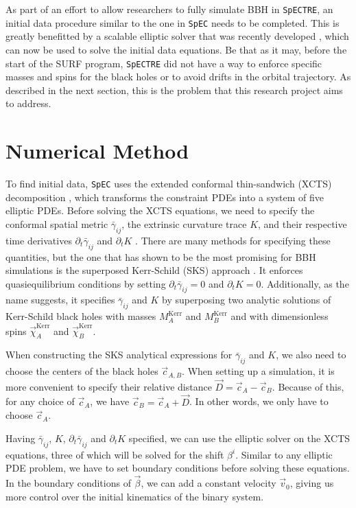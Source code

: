 \documentclass{../document}
\begin{document}
	As part of an effort to allow researchers to fully simulate BBH in {\tt SpECTRE}, an initial data procedure similar to the one in {\tt SpEC} needs to be completed. This is greatly benefitted by a scalable elliptic solver that was recently developed \cite{Vu}, which can now be used to solve the initial data equations. Be that as it may, before the start of the SURF program, {\tt SpECTRE} did not have a way to enforce specific masses and spins for the black holes or to avoid drifts in the orbital trajectory. As described in the next section, this is the problem that this research project aims to address.
  
  \section{Numerical Method}

  To find initial data, {\tt SpEC} uses the extended conformal thin-sandwich (XCTS) decomposition \cite{Serguei}, which transforms the constraint PDEs into a system of five elliptic PDEs. Before solving the XCTS equations, we need to specify the conformal spatial metric $\bar\gamma_{ij}$, the extrinsic curvature trace $K$, and their respective time derivatives $\partial_t \bar\gamma_{ij}$ and $\partial_t K$ \cite{BaumgarteShapiro}. There are many methods for specifying these quantities, but the one that has shown to be the most promising for BBH simulations is the superposed Kerr-Schild (SKS) approach \cite{Lovelace2008}. It enforces quasiequilibrium conditions by setting $\partial_t \bar\gamma_{ij}=0$ and $\partial_t K=0$. Additionally, as the name suggests, it specifies $\bar\gamma_{ij}$ and $K$ by superposing two analytic solutions of Kerr-Schild black holes with masses $M^\text{Kerr}_A$ and $M^\text{Kerr}_B$ and with dimensionless spins $\vec\chi^\text{Kerr}_A$ and $\vec\chi^\text{Kerr}_B$.

  When constructing the SKS analytical expressions for $\bar\gamma_{ij}$ and $K$, we also need to choose the centers of the black holes $\vec c_{A,B}$. When setting up a simulation, it is more convenient to specify their relative distance $\vec D=\vec c_A - \vec c_B$. Because of this, for any choice of $\vec c_A$, we have $\vec c_B = \vec c_A + \vec D$. In other words, we only have to choose $\vec c_A$.

  Having $\bar\gamma_{ij}$, $K$, $\partial_t \bar\gamma_{ij}$ and $\partial_t K$ specified, we can use the elliptic solver on the XCTS equations, three of which will be solved for the shift $\beta^i$. Similar to any elliptic PDE problem, we have to set boundary conditions before solving these equations. In the boundary conditions of $\vec\beta$, we can add a constant velocity $\vec v_0$, giving us more control over the initial kinematics of the binary system.
\end{document}
